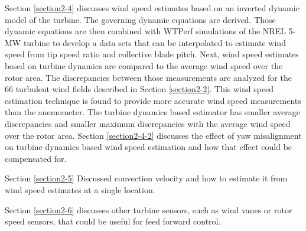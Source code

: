  Section \ref{section2-4} discusses wind speed estimates based on an inverted dynamic model of the turbine. The governing dynamic equations are derived. Those dynamic equations are then combined with WTPerf simulations of the NREL 5-MW turbine to develop a data sets that can be interpolated to estimate wind speed from tip speed ratio and collective blade pitch. Next, wind speed estimates based on turbine dynamics are compared to the average wind speed over the rotor area. The discrepancies between those measurements are analyzed for the 66 turbulent wind fields described in Section \ref{section2-2}. This wind speed estimation technique is found to provide more accurate wind speed measurements than the anemometer. The turbine dynamics based estimator has smaller average discrepancies and smaller maximum discrepancies with the average wind speed over the rotor area. Section \ref{section2-4-2} discusses the effect of yaw misalignment on turbine dynamics based wind speed estimation and how that effect could be compensated for. 
 
 Section \ref{section2-5} Discussed convection velocity and how to estimate it from wind speed estimates at a single location. 
 
 Section \ref{section2-6} discusses other turbine sensors, such as wind vanes or rotor speed sensors, that could be useful for feed forward control.